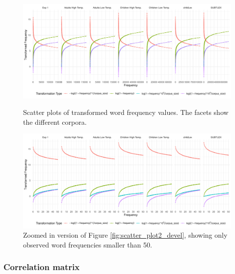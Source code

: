 \documentclass[doc, a4paper]{apa7}
\begin{document}
\begin{figure}[!htbp]
    \centering
    \begin{minipage}[t]{1\textwidth}
     \centering
    \includegraphics[width=\textwidth]{figures/scatter_plot2_devel.pdf}
    \caption{ Scatter plots of transformed word frequency values. The facets show the different corpora.}
    \label{fig:scatter_plot2_devel}



    \centering
    \includegraphics[width=\textwidth]{figures/scatter_plot_devel.pdf}
    \caption{ Zoomed in version of Figure \ref{fig:scatter_plot2_devel}, showing only observed word frequencies smaller than 50.}
    \label{fig:scatter_plot_devel}
  \end{minipage}
\end{figure}

\clearpage


\subsubsection{Correlation matrix}
\end{document}
